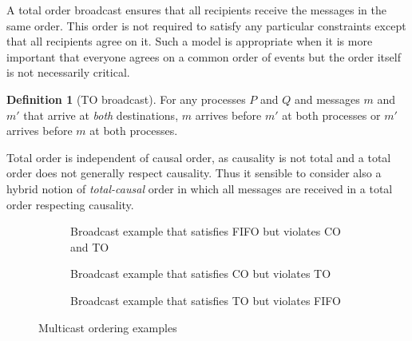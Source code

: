 \documentclass[]             %
{NASA}                       %
\theoremstyle{definition}
\newtheorem{definition}[theorem]{Definition}
\begin{document}
A total order broadcast ensures that all recipients receive the
messages in the same order. This order is not required to satisfy any
particular constraints except that all recipients agree on it. Such a
model is appropriate when it is more important that everyone agrees on
a common order of events but the order itself is not necessarily
critical.

\begin{definition}[TO broadcast]
  \label{def:totalorderbroadcast} For any processes $P$ and $Q$ and
  messages $m$ and $m'$ that arrive at \emph{both} destinations, $m$
  arrives before $m'$ at both processes or $m'$ arrives before $m$ at
  both processes.
\end{definition}

Total order is independent of causal order, as causality is not total
and a total order does not generally respect causality. Thus it
sensible to consider also a hybrid notion of \emph{total-causal} order
in which all messages are received in a total order respecting
causality.

\begin{figure}[p]
  \setlength\belowcaptionskip{5ex}
  \begin{subfigure}{1\textwidth}
    \centering
    
    \caption{Broadcast example that satisfies FIFO but violates CO and TO}
    \label{fig:bcast-order-examples-1}
  \end{subfigure}
  \begin{subfigure}{1\textwidth}
    \centering
    
    \caption{Broadcast example that satisfies CO but violates TO}
    \label{fig:bcast-order-examples-2}
  \end{subfigure}
  \begin{subfigure}{1\textwidth}
    \centering
    
    \caption{Broadcast example that satisfies TO but violates FIFO}
    \label{fig:bcast-order-examples-3}
  \end{subfigure}
  \caption{Multicast ordering examples}
  \label{fig:bcast-ordering-examples}
\end{figure}
\end{document}
